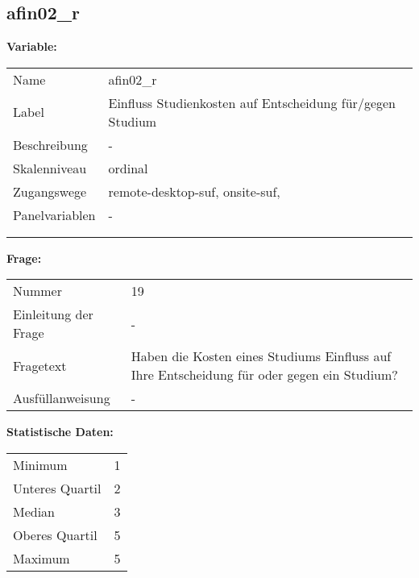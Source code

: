 	
	
	\subsection{afin02\_r}
	\label{subSection:afin02_r}

	\noindent\textbf{Variable:}\\
		\begin{tabular}{lL{11.3cm}}
			\label{tableVariable:afin02_r}
			Name & afin02\_r \\
			Label & Einfluss Studienkosten auf Entscheidung für/gegen Studium \\
			Beschreibung & - \\
			Skalenniveau & ordinal \\
			Zugangswege &
				remote-desktop-suf,
				onsite-suf,
 \\
			Panelvariablen & -
			 \\
			 \\
 \\
		\end{tabular}

		\vspace*{1 cm}
		\noindent\textbf{Frage:}\\
		\begin{tabular}{lL{11.3cm}}
			\label{tableQuestion:afin02_r}
			Nummer & 19 \\
			Einleitung der Frage & - \\
			Fragetext & Haben die Kosten eines Studiums Einfluss auf Ihre Entscheidung für oder gegen ein Studium? \\
			Ausfüllanweisung & - \\
		\end{tabular}


		\vspace*{1 cm}
		\noindent\textbf{Statistische Daten:}\\
			\begin{tabular}{ll}
				\label{tableStatistics:afin02_r}
					Minimum & 1 \\
					Unteres Quartil & 2 \\
					Median & 3 \\
					Oberes Quartil & 5 \\
					Maximum & 5 \\
			\end{tabular}



